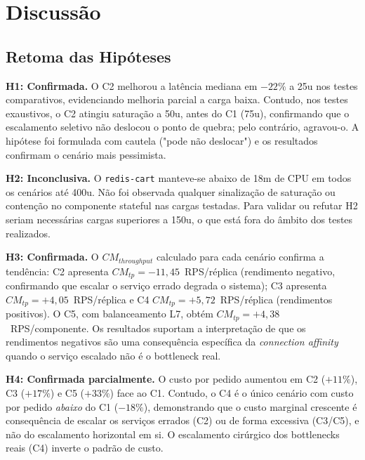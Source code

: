 \documentclass[manuscript,oneside]{acmart}
\begin{document}
\section{Discussão}
\label{sec:discussao}

\subsection{Retoma das Hipóteses}
\label{sec:hipoteses-discussao}

\textbf{H1: Confirmada.} O C2 melhorou a latência mediana em $-22\%$ a 25u nos testes comparativos, evidenciando melhoria parcial a carga baixa. Contudo, nos testes exaustivos, o C2 atingiu saturação a 50u, antes do C1 (75u), confirmando que o escalamento seletivo não deslocou o ponto de quebra; pelo contrário, agravou-o. A hipótese foi formulada com cautela ("pode não deslocar") e os resultados confirmam o cenário mais pessimista.

\textbf{H2: Inconclusiva.} O \texttt{redis-cart} manteve-se abaixo de 18m de CPU em todos os cenários até 400u. Não foi observada qualquer sinalização de saturação ou contenção no componente stateful nas cargas testadas. Para validar ou refutar H2 seriam necessárias cargas superiores a 150u, o que está fora do âmbito dos testes realizados.

\textbf{H3: Confirmada.} O $CM_{throughput}$ calculado para cada cenário confirma a tendência: C2 apresenta $CM_{tp}=-11{,}45$~RPS/réplica (rendimento negativo, confirmando que escalar o serviço errado degrada o sistema); C3 apresenta $CM_{tp}=+4{,}05$~RPS/réplica e C4 $CM_{tp}=+5{,}72$~RPS/réplica (rendimentos positivos). O C5, com balanceamento L7, obtém $CM_{tp}=+4{,}38$~RPS/componente. Os resultados suportam a interpretação de que os rendimentos negativos são uma consequência específica da \textit{connection affinity} quando o serviço escalado não é o bottleneck real.

\textbf{H4: Confirmada parcialmente.} O custo por pedido aumentou em C2 ($+11\%$), C3 ($+17\%$) e C5 ($+33\%$) face ao C1. Contudo, o C4 é o único cenário com custo por pedido \emph{abaixo} do C1 ($-18\%$), demonstrando que o custo marginal crescente é consequência de escalar os serviços errados (C2) ou de forma excessiva (C3/C5), e não do escalamento horizontal em si. O escalamento cirúrgico dos bottlenecks reais (C4) inverte o padrão de custo.
\end{document}
